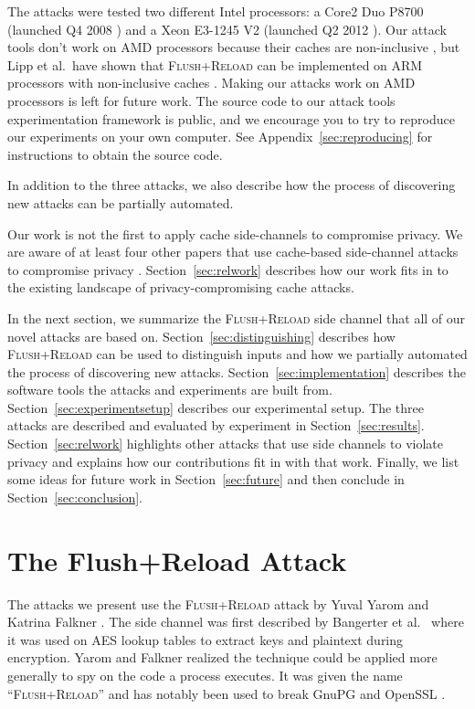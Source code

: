 \documentclass[letterpaper,twocolumn,10pt]{article}
\begin{document}
The attacks were tested two different Intel processors: a Core2 Duo P8700
(launched Q4 2008 \cite{intelp8700page}) and a Xeon E3-1245 V2 (launched Q2 2012
\cite{intele31245page}). Our attack tools don't work on AMD processors because
their caches are non-inclusive \cite{yarom2013flush}, but Lipp et al.\ have
shown that \textsc{Flush+Reload} can be implemented on ARM processors with
non-inclusive caches \cite{lipp2015armageddon}. Making our attacks work on AMD
processors is left for future work. The source code to our attack tools
experimentation framework is public, and we encourage you to try to reproduce
our experiments on your own computer. See Appendix~\ref{sec:reproducing} for
instructions to obtain the source code.

In addition to the three attacks, we also describe how the process of
discovering new attacks can be partially automated.

Our work is not the first to apply cache side-channels to compromise privacy. We
are aware of at least four other papers that use cache-based side-channel
attacks to compromise privacy \cite{gruss2015cache, zhang2014cross, oren2015spy,
lipp2015armageddon}. Section~\ref{sec:relwork} describes how our work fits in to
the existing landscape of privacy-compromising cache attacks.

In the next section, we summarize the \textsc{Flush+Reload} side channel that
all of our novel attacks are based on. Section~\ref{sec:distinguishing}
describes how \textsc{Flush+Reload} can be used to distinguish inputs and how we
partially automated the process of discovering new attacks.
Section~\ref{sec:implementation} describes the software tools the attacks and
experiments are built from. Section~\ref{sec:experimentsetup} describes our
experimental setup. The three attacks are described and evaluated by experiment
in Section~\ref{sec:results}. Section~\ref{sec:relwork} highlights other attacks
that use side channels to violate privacy and explains how our contributions fit
in with that work. Finally, we list some ideas for future work in
Section~\ref{sec:future} and then conclude in Section~\ref{sec:conclusion}.

\section{The Flush+Reload Attack}
\label{sec:flushreload}

The attacks we present use the \textsc{Flush+Reload} attack by Yuval Yarom and
Katrina Falkner \cite{yarom2013flush}. The side channel was first described by
Bangerter et al.\ \cite{gullasch2011cache} where it was used on AES lookup
tables to extract keys and plaintext during encryption. Yarom and Falkner
realized the technique could be applied more generally to spy on the code
a process executes. It was given the name ``\textsc{Flush+Reload}'' and has
notably been used to break GnuPG \cite{yarom2013flush} and OpenSSL
\cite{benger2014ooh, yarom2014recovering}.
\end{document}
